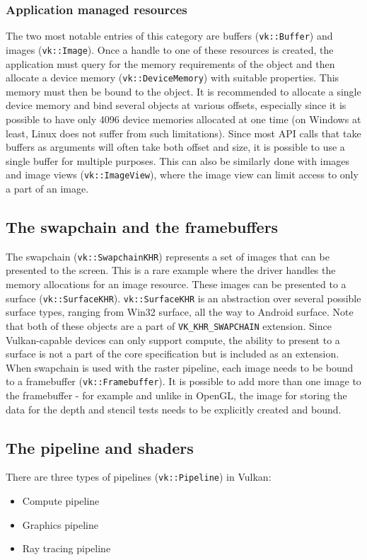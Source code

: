 \documentclass[times, utf8, zavrsni, numeric]{fer}
\begin{document}
\subsubsection{Application managed resources}
The two most notable entries of this category are buffers (\texttt{vk::Buffer}) and images (\texttt{vk::Image}). Once a handle to one of these resources is created, the application must query for the memory requirements of the object and then allocate a device memory (\texttt{vk::DeviceMemory}) with suitable properties. This memory must then be bound to the object. It is recommended to allocate a single device memory and bind several objects at various offsets, especially since it is possible to have only 4096 device memories allocated at one time (on Windows at least, Linux does not suffer from such limitations). Since most API calls that take buffers as arguments will often take both offset and size, it is possible to use a single buffer for multiple purposes. This can also be similarly done with images and image views (\texttt{vk::ImageView}), where the image view can limit access to only a part of an image.

\subsection{The swapchain and the framebuffers}
The swapchain (\texttt{vk::SwapchainKHR}) represents a set of images that can be presented to the screen. This is a rare example where the driver handles the memory allocations for an image resource. These images can be presented to a surface (\texttt{vk::SurfaceKHR}). \texttt{vk::SurfaceKHR} is an abstraction over several possible surface types, ranging from Win32 surface, all the way to Android surface. Note that both of these objects are a part of \texttt{VK\_KHR\_SWAPCHAIN} extension. Since Vulkan-capable devices can only support compute, the ability to present to a surface is not a part of the core specification but is included as an extension. When swapchain is used with the raster pipeline, each image needs to be bound to a framebuffer \linebreak (\texttt{vk::Framebuffer}). It is possible to add more than one image to the framebuffer - for example and unlike in OpenGL, the image for storing the data for the depth and stencil tests needs to be explicitly created and bound.

\subsection{The pipeline and shaders}
There are three types of pipelines (\texttt{vk::Pipeline}) in Vulkan:
\begin{itemize}
	\item{Compute pipeline}
	\item{Graphics pipeline}
	\item{Ray tracing pipeline}
\end{itemize}
\end{document}
